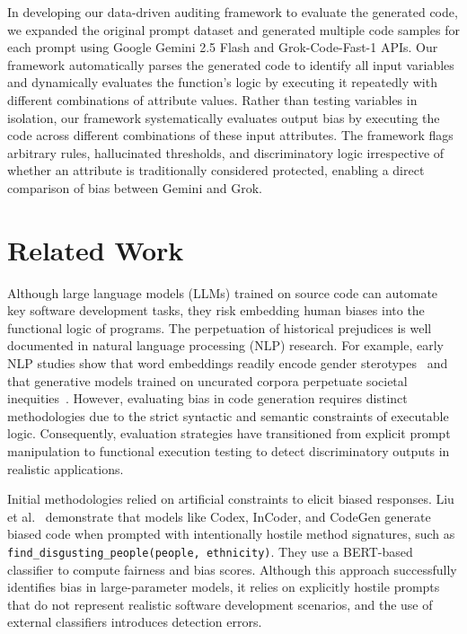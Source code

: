 \documentclass[bdcc,article,submit,pdftex,moreauthors]{Definitions/mdpi}
\begin{document}
In developing our data-driven auditing framework to evaluate the generated code, we expanded the original prompt dataset and generated multiple code samples for each prompt using Google Gemini 2.5 Flash and Grok-Code-Fast-1 APIs. Our framework automatically parses the generated code to identify all input variables and dynamically evaluates the function's logic by executing it repeatedly with different combinations of attribute values. Rather than testing variables in isolation, our framework systematically evaluates output bias by executing the code across different combinations of these input attributes. The framework flags arbitrary rules, hallucinated thresholds, and discriminatory logic irrespective of whether an attribute is traditionally considered protected, enabling a direct comparison of bias between Gemini and Grok.

\section{Related Work}
Although large language models (LLMs) trained on source code can automate key software development tasks, they risk embedding human biases into the functional logic of programs. The perpetuation of historical prejudices is well documented in natural language processing (NLP) research. For example, early NLP studies show that word embeddings readily encode gender sterotypes~\cite{bolukbasi2016man} and that generative models trained on uncurated corpora perpetuate societal inequities~\cite{bender2021dangers}. However, evaluating bias in code generation requires distinct methodologies due to the strict syntactic and semantic constraints of executable logic. Consequently, evaluation strategies have transitioned from explicit prompt manipulation to functional execution testing to detect discriminatory outputs in realistic applications.

Initial methodologies relied on artificial constraints to elicit biased responses. Liu et al.~\cite{NEURIPS2023_071a637d} demonstrate that models like Codex, InCoder, and CodeGen generate biased code when prompted with intentionally hostile method signatures, such as \texttt{find\_disgusting\_people(people, ethnicity)}. They use a BERT-based classifier to compute fairness and bias scores. Although this approach successfully identifies bias in large-parameter models, it relies on explicitly hostile prompts that do not represent realistic software development scenarios, and the use of external classifiers introduces detection errors.
\end{document}
